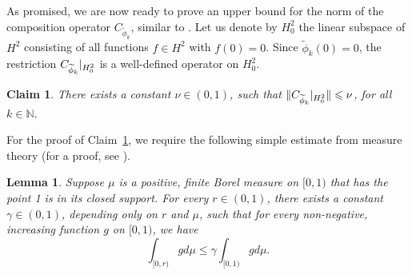 \documentclass[11pt, reqno]{amsart}
\newtheorem{lemma}[theorem]{Lemma}
\newtheorem{claim}[theorem]{Claim}
\theoremstyle{definition}
\numberwithin{equation}{section}
\newcommand{\N}{\mathbb{N}}
\renewcommand{\leq}{\leqslant}
\begin{document}
As promised, we are now ready to prove an upper bound for the norm of the composition operator $C_{\widetilde{\phi}_k}$, similar to \cite[Theorem 5.1]{Sh2000}. Let us denote by $H_0^2$ the linear subspace of $H^2$ consisting of all functions $f\in H^2$ with $f(0)=0$. Since $\widetilde{\phi}_k(0)=0$, the restriction $C_{\widetilde{\phi}_k}\arrowvert_{H_0^2}$ is a well-defined operator on $H_0^2$. 

\begin{claim}\label{claim2}
There exists a constant $\nu\in(0,1)$, such that $\lVert C_{\widetilde{\phi}_k}\arrowvert_{H_0^2}\rVert\leq \nu$, for all $k\in\N$.
\end{claim}

For the proof of Claim~\ref{claim2}, we require the following simple estimate from measure theory (for a proof, see \cite[Lemma 2.7]{Sh2000}).

\begin{lemma}\label{shlemma}
Suppose $\mu$ is a positive, finite Borel measure on $[0,1)$ that has the point 1 is in its closed support. For every $r\in(0,1)$, there exists a constant $\gamma\in(0,1)$, depending only on $r$ and $\mu$, such that for every non-negative, increasing function $g$ on $[0,1)$, we have
\[
\int_{[0,r)}g d \mu\leq \gamma \int_{[0,1)} g d \mu.
\]
\end{lemma}
\end{document}
